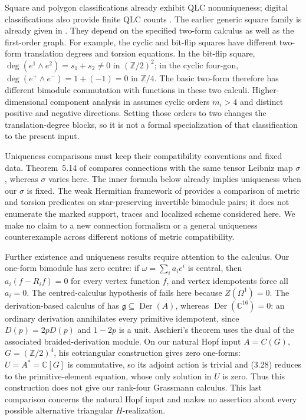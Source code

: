 \documentclass[11pt,a4paper]{article}
\theoremstyle{remark}\newtheorem{remark}[theorem]{Remark}
\begin{document}
Square and polygon classifications already exhibit QLC nonuniqueness;
digital classifications also provide finite QLC counts
\cite{orig-square,orig-polygon,orig-digital}. The earlier generic square
family is already given in \cite[Section~5]{orig-emergence}. They depend
on the specified two-form calculus as well as the first-order graph.
For example, the cyclic and bit-flip squares have different two-form
translation degrees and torsion equations. In the bit-flip square,
$\deg(e^1\wedge e^2)=s_1+s_2\ne0$ in $(\mathbb Z/2)^2$;
in the cyclic four-gon,
$\deg(e^+\wedge e^-)=1+(-1)=0$ in $\mathbb Z/4$.
The basic two-form therefore has different bimodule commutation with
functions in these two calculi. Higher-dimensional component
analysis in \cite[Section~5.2, pp.~242--245]{orig-vh25} assumes cyclic orders $m_i>4$ and distinct
positive and negative directions. Setting those orders to two changes
the translation-degree blocks, so it is not a formal specialization of
that classification to the present input.

Uniqueness comparisons must keep their compatibility conventions and
fixed data. Theorem~5.14 of \cite{orig-mr25} compares connections with
the same tensor Leibniz map $\sigma$, whereas $\sigma$ varies here.
The inner formula below already implies uniqueness when our $\sigma$
is fixed. The weak Hermitian framework of \cite[Theorems~3.11 and~4.12]{orig-bgg} provides a
comparison of metric and torsion predicates on star-preserving invertible
bimodule pairs; it does not enumerate the marked support, traces and
localized scheme considered here. We make no claim to a new connection
formalism or a general uniqueness counterexample across different notions
of metric compatibility.

Further existence and uniqueness results require attention to the calculus.
Our one-form bimodule has zero centre: if $\omega=\sum_i a_ie^i$ is
central, then $a_i(f-R_if)=0$ for every vertex function $f$, and vertex
idempotents force all $a_i=0$. The centred-calculus hypothesis of
\cite[Definition~3.15 and Theorem~4.24]{orig-fmr26} fails here because
$Z(\Omega^1)=0$.  The derivation-based calculus of
\cite[Definitions~2.1 and~3.12, Theorem~7.2]{orig-ah26} has
$\mathfrak g\subseteq\operatorname{Der}(A)$, whereas
$\operatorname{Der}(\mathbb C^{16})=0$: an ordinary derivation
annihilates every primitive idempotent, since $D(p)=2pD(p)$ and $1-2p$
is a unit.
Aschieri's theorem \cite[Theorem~6.7]{orig-aschieri26} uses the dual of
the associated braided-derivation module.  On our natural Hopf input
$A=C(G)$, $G=(\mathbb Z/2)^4$, his cotriangular construction
\cite[Example~3.9, equations~(3.25) and~(3.28)]{orig-aschieri26}
gives zero one-forms: $U=A^*=\mathbb C[G]$ is commutative, so its adjoint
action is trivial and (3.28) reduces to the primitive-element equation,
whose only solution in $U$ is zero.  Thus this construction does not
give our rank-four Grassmann calculus.  This last comparison concerns
the natural Hopf input and makes no assertion about every possible
alternative triangular $H$-realization.
\end{document}
